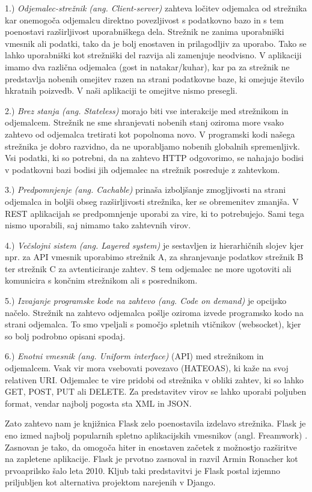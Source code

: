 \documentclass[a4paper, 12pt]{book}
\begin{document}
1.)\textit{ Odjemalec-strežnik (ang. Client-server)} zahteva ločitev odjemalca od strežnika kar onemogoča odjemalcu direktno povezljivost s podatkovno bazo in s tem poenostavi razširljivost uporabniškega dela. Strežnik ne zanima uporabniški vmesnik ali podatki, tako da je bolj enostaven in prilagodljiv za uporabo. Tako se lahko uporabniški kot strežniški del razvija ali zamenjuje neodvisno. V aplikaciji imamo dva različna odjemalca (gost in natakar/kuhar), kar pa za strežnik ne predstavlja nobenih omejitev razen na strani podatkovne baze, ki omejuje število hkratnih poizvedb. V naši aplikaciji te omejitve nismo presegli.

2.)\textit{ Brez stanja (ang. Stateless)} morajo biti vse interakcije med strežnikom in odjemalcem. Strežnik ne sme shranjevati nobenih stanj oziroma more vsako zahtevo od odjemalca tretirati kot popolnoma novo. V programski kodi našega strežnika je dobro razvidno, da ne uporabljamo nobenih globalnih spremenljivk. Vsi podatki, ki so potrebni, da na zahtevo HTTP odgovorimo, se nahajajo bodisi v podatkovni bazi bodisi jih odjemalec na strežnik posreduje z zahtevkom.

3.)\textit{ Predpomnjenje (ang. Cachable)} prinaša izboljšanje zmogljivosti na strani odjemalca in boljši obseg razširljivosti strežnika, ker se obremenitev zmanjša. V REST aplikacijah se predpomnjenje uporabi za vire, ki to potrebujejo. Sami tega nismo uporabili, saj nimamo tako zahtevnih virov.

4.)\textit{ Večslojni sistem (ang. Layered system)} je sestavljen iz hierarhičnih slojev kjer npr. za API vmesnik uporabimo strežnik A, za shranjevanje podatkov strežnik B ter strežnik C za avtenticiranje zahtev. S tem odjemalec ne more ugotoviti ali komunicira s končnim strežnikom ali s posrednikom.

5.)\textit{ Izvajanje programske kode na zahtevo (ang. Code on demand)} je opcijsko načelo. Strežnik na zahtevo odjemalca pošlje oziroma izvede programsko kodo na strani odjemalca. To smo vpeljali s pomočjo spletnih vtičnikov (websocket), kjer so bolj podrobno opisani spodaj.

6.)\textit{ Enotni vmesnik (ang. Uniform interface)} (API) med strežnikom in odjemalcem. Vsak vir mora vsebovati povezavo (HATEOAS), ki kaže na svoj relativen URI. Odjemalec te vire pridobi od strežnika v obliki zahtev, ki so lahko GET, POST, PUT ali DELETE. Za predstavitev virov se lahko uporabi poljuben format, vendar najbolj pogosta sta XML in JSON. 

Zato zahtevo nam je knjižnica Flask zelo poenostavila izdelavo strežnika. Flask je eno izmed najbolj popularnih spletno aplikacijskih vmesnikov (angl. Freamwork) \cite{Flask}. Zasnovan je tako, da omogoča hiter in enostaven začetek z možnostjo razširitve na zapletene aplikacije. Flask je prvotno zasnoval in razvil Armin Ronacher kot prvoaprilsko šalo leta 2010. Kljub taki predstavitvi je Flask postal izjemno priljubljen kot alternativa projektom narejenih v Django.
\end{document}

